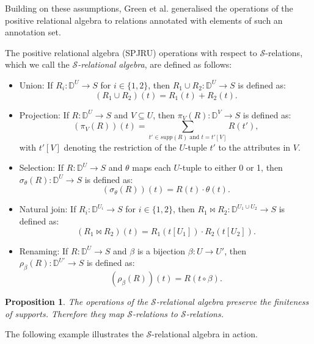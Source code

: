 \documentclass[oneside, 11pt]{amsbook}
\theoremstyle{plain}
\newtheorem{prop}[thm]{Proposition}
\theoremstyle{definition}
\theoremstyle{remark}
\begin{document}
Building on these assumptions, Green et al. \cite{Green2007} generalised the operations of the positive relational algebra to relations annotated with elements of such an annotation set.

\begin{defn}
    \label{S-relationalalgebra}
    The positive relational algebra (SPJRU) operations with respect to $\mathcal{S}$-relations, which we call the \emph{$\mathcal{S}$-relational algebra}, are defined as follows:
    \begin{itemize}
        \item Union: If $R_i : \mathbb{D}^U \to S$ for $i \in \{1,2\}$, then $R_1 \cup R_2 : \mathbb{D}^U \to S$ is defined as:
              \[
                  (R_1 \cup R_2)(t) = R_1(t) + R_2(t).
              \]
        \item Projection: If $R : \mathbb{D}^U \to S$ and $V \subseteq U$, then $\pi_V(R) : \mathbb{D}^V \to S$ is defined as:
              \[
                  (\pi_V(R))(t) = \sum_{t' \in supp(R) \text{ and } t=t'[V]} R(t'),
              \]
              with $t'[V]$ denoting the restriction of the $U$-tuple $t'$ to the attributes in $V$.
        \item Selection: If $R : \mathbb{D}^U \to S$ and $\theta$ maps each $U$-tuple to either 0 or 1, then $\sigma_\theta(R) : \mathbb{D}^U \to S$ is defined as:
              \[
                  (\sigma_\theta(R))(t) = R(t) \cdot \theta(t).
              \]
        \item Natural join: If $R_i : \mathbb{D}^{U_i} \to S$ for $i \in \{1,2\}$, then $R_1 \bowtie R_2 : \mathbb{D}^{U_1 \cup U_2} \to S$ is defined as:
              \[
                  (R_1 \bowtie R_2)(t) = R_1(t[U_1]) \cdot R_2(t[U_2]).
              \]
        \item Renaming: If $R : \mathbb{D}^U \to S$ and $\beta$ is a bijection $\beta : U \to U'$, then $\rho_\beta(R) : \mathbb{D}^{U'} \to S$ is defined as:
              \[
                  (\rho_\beta(R))(t) = R(t \circ \beta).
              \]
    \end{itemize}
\end{defn}

\begin{prop}
    The operations of the $\mathcal{S}$-relational algebra preserve the finiteness of supports. Therefore they map $\mathcal{S}$-relations to $\mathcal{S}$-relations.
\end{prop}

The following example illustrates the $\mathcal{S}$-relational algebra in action.
\end{document}
